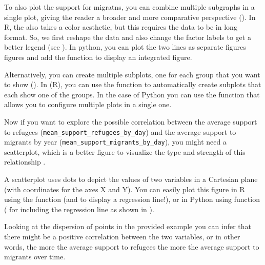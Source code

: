 To also plot the support for migratns, you can combine multiple subgraphs in a single plot,
giving the reader a broader and more comparative perspective ().
In R, the  also takes a color aesthetic, but this requires the data to be in long format.
So, we first reshape the data and also change the factor labels to get a better legend (see ).
In python, you can plot the two lines as separate figures figures and add the  function  to display an integrated figure.


Alternatively, you can create multiple subplots, one for each group that you want to show ().
In  (R), you can use the  function to automatically create subplots that each show one of the groups. In the case of Python you can use the  function  that allows you to configure multiple plots in a single one.


Now if you want to explore the possible correlation between the average support to refugees (\texttt{mean\_support\_refugees\_by\_day}) and the average support to migrants by year (\texttt{mean\_support\_migrants\_by\_day}), you might need a scatterplot, which is a better figure to visualize the type and strength of this relationship . 


A scatterplot uses dots to depict the values of two variables in a Cartesian plane (with coordinates for the axes X and Y). You can easily plot this figure in R using the  function  (and  to display a regression line!), or in Python using  function  ( for including the regression line as shown in ). 


Looking at the dispersion of points in the provided example you can infer that there might be a positive correlation between the two variables, or in other words, the more the average support to refugees the more the average support to migrants over time.

